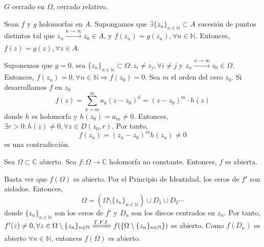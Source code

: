 \begin{obs}
  $G$ cerrado en $\Omega$, cerrado relativo.
\end{obs}


\begin{theo}
  Sean $f$ y $g$ holomorfas en $A$. Supongamos que $\exists \{ z_{n} \}_{n \in \mathbb{N}} \subset A$ sucesión de puntos distintos tal que $z_{n} \xrightarrow[]{ n \rightarrow \infty } z_{0} \in A$, y $f(z_{n}) = g(z_{n}), \forall n \in \mathbb{N}$. Entonces, $f(z) = g(z), \forall z \in A$.
\end{theo}

\begin{dem}
  Suponemos que $g = 0$. sea $\{ z_{n} \}_{n \in \mathbb{N}} \subset \Omega : z_{i} \neq z_{j}, \forall i \neq j$ y $z_{n} \xrightarrow[]{ n \rightarrow \infty } z_{0} \in \Omega$. Entonces, $f(z_{n}) = 0, \forall n \in \mathbb{N} \Rightarrow f(z_{0}) = 0$. Sea $m$ el orden del cero $z_{0}$. Si desarrollamos $f$ en $z_{0}$
  \[ 
    f(z) = \sum_{k = m}^{\infty} a_{k}(z - z_{0})^{k} = (z - z_{0})^{m} \cdot h(z) 
  \] 
  donde $h$ es holomorfa y $h(z_{0}) = a_{m} \neq 0$. Entonces, $\exists r > 0 : h(z) \neq 0, \forall z \in D(z_{0}, r)$. Por tanto,
  \[ 
    f(z_{n}) = (z_{n} - z_{0})^{m} h(z_{n}) \neq 0
  \] 
  es una contradicción.
\end{dem}

\begin{theo}
  Sea $\Omega \subset \mathbb{C}$ abierto. Sea $f : \Omega \to \mathbb{C}$ holomorfa no constante. Entonces, $f$ es abierta.
\end{theo}

\begin{dem}
  Basta ver que $f(\Omega)$ es abierto. Por el Principio de Identidad, los ceros de $f'$ son aislados. Entonces,
  \[ 
    \Omega = (\Omega \setminus \{ z_{n} \}_{n \in \mathbb{N}}) \cup D_{1} \cup D_{2} \cdots 
  \] 
  donde $\{ z_{n} \}_{n \in \mathbb{N}}$ son los ceros de $f'$ y $D_{n}$ son los discos centrados en $z_n$. Por tanto, $f'(z) \neq 0, \forall z \in \Omega \setminus \{ z_{n} \}_{n \in \mathbb{N}} \xRightarrow[]{ T.F.I } f(\{ \Omega \setminus \{ z_{n} \}_{n \in \mathbb{N}} \})$ es abierto. Como $f(D_{n})$ es abierto $\forall n \in \mathbb{N}$, entonces $f(\Omega)$ es abierto.
\end{dem}

